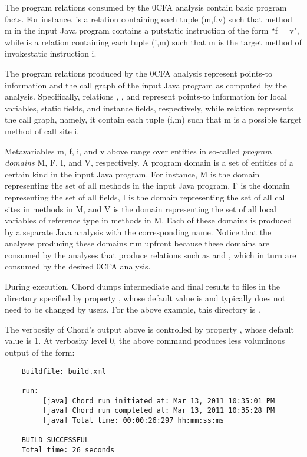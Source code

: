 The program relations consumed by the 0CFA analysis contain basic program facts.  For instance,
 is a relation containing each tuple (m,f,v) such that method m in the input Java
program contains a putstatic instruction of the form ``f = v", while  is a relation
containing each tuple (i,m) such that m is the target method of invokestatic instruction i.

The program relations produced by the 0CFA analysis represent points-to information and the
call graph of the input Java program as computed by the analysis.
Specifically, relations , , and  represent points-to information 
for local variables, static fields, and instance fields, respectively,
while relation  represents the call graph, namely, it contain each tuple (i,m) such that
m is a possible target method of call site i.

Metavariables m, f, i, and v above range over entities in so-called {\it program domains} M, F, I, and V, respectively.
A program domain is a set of entities of a certain kind in the input Java program.  For instance, M is the domain representing
the set of all methods in the input Java program, F is the domain representing the set of all fields, I is the domain representing
the set of all call sites in methods in M, and V is the domain representing the set of all local variables of reference type in methods in M.
Each of these domains is produced by a separate Java analysis with the corresponding name.
Notice that the analyses producing these domains run upfront because these domains
are consumed by the analyses that produce relations such as  and
, which in turn are consumed by the desired 0CFA analysis.

During execution, Chord dumps intermediate and final results to files in the
directory specified by property , whose default value is 
and typically does not need to be changed by users.
For the above example, this directory is .

The verbosity of Chord's output above is controlled by property , whose
default value is 1.  At verbosity level 0, the above command produces less voluminous output
of the form:

\begin{verbatim}
	Buildfile: build.xml
	
	run:
	     [java] Chord run initiated at: Mar 13, 2011 10:35:01 PM
	     [java] Chord run completed at: Mar 13, 2011 10:35:28 PM
	     [java] Total time: 00:00:26:297 hh:mm:ss:ms

    BUILD SUCCESSFUL
    Total time: 26 seconds
\end{verbatim}
